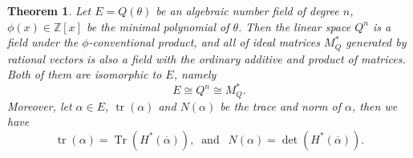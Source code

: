 \documentclass [11pt]{article}
\newtheorem{thm}{\bf Theorem}[section]
\begin{document}
\begin{thm}\label{th2}
Let $E=Q(\theta)$ be an algebraic number field of degree $ n$, $\phi(x) \in \mathbb{Z}[x]$ be the minimal polynomial of $\theta$. Then the linear space $Q^{n}$ is a field under the $\phi$-conventional product, and all of ideal matrices $M_{Q}^{*}$ generated by rational vectors is also a field with the ordinary additive and product of matrices. Both of them are  isomorphic to $E$, namely
\begin{equation}\label{2.18}
E \cong Q^{n} \cong M_{Q}^{*} .
\end{equation}
Moreover, let $\alpha \in  E$,  $\operatorname{tr}(\alpha)$ and $N(\alpha)$ be the trace and norm of $\alpha$, then we have
\begin{equation}\label{2.19}
\operatorname{tr}(\alpha)=\operatorname{Tr}\left(H^{*}(\overline{\alpha})\right),\  \text { and } \ \ N(\alpha)=\operatorname{det}\left(H^{*}(\overline{\alpha})\right) .
\end{equation}
\end{thm}
\end{document}
